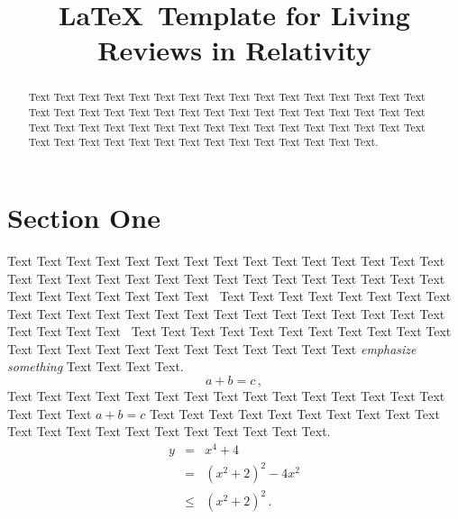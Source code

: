 \documentclass{article}
\begin{document}
\title{\LaTeX\ Template for Living Reviews in Relativity}

\author{%
\and
{}
\and
{}
}

\date{}
\maketitle

\begin{abstract}
Text Text Text  Text Text Text Text Text Text Text Text Text  Text
Text Text Text Text Text Text Text Text  Text Text Text Text Text Text
Text Text Text  Text Text Text Text Text Text Text Text Text  Text
Text Text Text Text Text Text Text Text  Text Text Text Text Text Text
Text Text Text  Text Text Text Text Text.
\end{abstract}



\newpage


\section{Section One}
\label{sec:section}

%

Text Text Text Text Text Text Text Text  Text Text Text Text Text Text
Text Text Text Text Text Text
Text Text Text Text Text Text Text Text Text Text Text Text Text Text
Text Text Text~\cite{authorYear} Text Text Text Text Text Text Text
Text Text Text Text Text Text Text Text Text Text Text Text Text Text 
Text Text Text Text Text Text~\cite{otherAuthorYear} Text Text Text Text
Text Text Text Text Text Text Text Text Text Text Text Text Text Text 
Text Text Text Text Text \emph{emphasize something} Text Text Text Text. 
%
\begin{equation}
  a + b = c \,,
  \label{eq:equation1}
\end{equation}
%
Text Text Text Text Text Text Text Text Text Text Text Text Text Text 
Text Text Text  Text $ a + b = c $ Text Text Text Text Text Text Text 
Text Text Text Text Text Text Text Text Text Text Text Text Text Text.
%
\begin{eqnarray}
 y &=& x^4 + 4          \nonumber \\
   &=& (x^2 + 2)^2 -4x^2 \nonumber \\
   &\le& (x^2 + 2)^2 \,.
 \label{eq:equation2}
\end{eqnarray}
\end{document}
